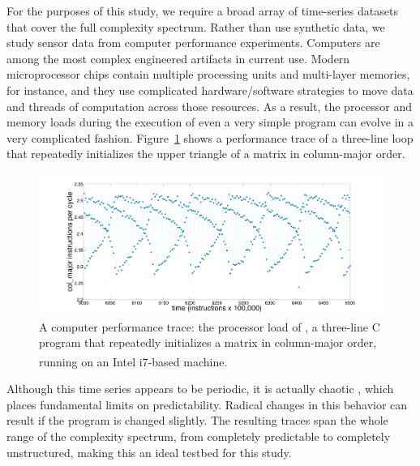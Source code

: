 For the purposes of this study, we require a broad array of
time-series datasets that cover the full complexity spectrum.  Rather
than use synthetic data, we study sensor data from computer
performance experiments.  Computers are among the most complex
engineered artifacts in current use.  Modern microprocessor chips
contain multiple processing units and multi-layer memories, for
instance, and they use complicated hardware/software strategies to
move data and threads of computation across those resources.  As a
result, the processor and memory loads during the execution of even a
very simple program can evolve in a very complicated fashion.
Figure~\ref{fig:ipc} shows a performance trace of a three-line loop
that repeatedly initializes the upper triangle of a matrix in
column-major order.
%
 \begin{figure}[htbp]
    \centering
    \includegraphics[width=\columnwidth]{figs/colshortts}
    \caption{A computer performance trace: the processor load of \col,
      a three-line C program that repeatedly initializes a matrix in
      column-major order, running on an Intel
      i7\textsuperscript{\textregistered}-based machine.}
   \label{fig:ipc}
  \end{figure}
%
Although this time series appears to be periodic, it is actually
chaotic \cite{mytkowicz09}, which places fundamental limits on
predictability.  Radical changes in this behavior can result if the
program is changed slightly.  The resulting traces span the whole
range of the complexity spectrum, from completely predictable to
completely unstructured, making this an ideal testbed for this study.

